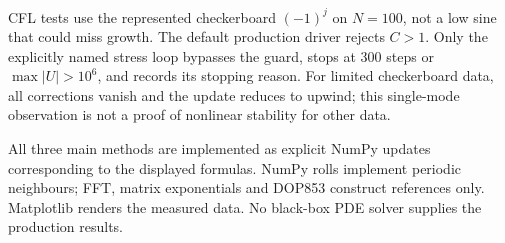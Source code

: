 CFL tests use the represented checkerboard $(-1)^j$ on $N=100$, not a low sine that could miss growth. The default production driver rejects $C>1$. Only the explicitly named stress loop bypasses the guard, stops at 300 steps or $\max|U|>10^6$, and records its stopping reason. For limited checkerboard data, all corrections vanish and the update reduces to upwind; this single-mode observation is not a proof of nonlinear stability for other data.

All three main methods are implemented as explicit NumPy updates corresponding to the displayed formulas. NumPy rolls implement periodic neighbours; FFT, matrix exponentials and DOP853 construct references only. Matplotlib renders the measured data. No black-box PDE solver supplies the production results.
